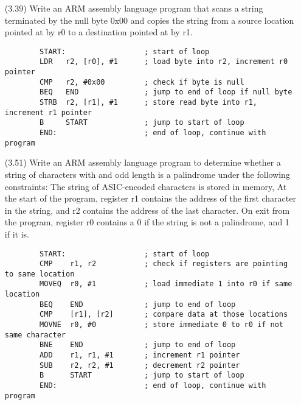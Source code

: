 \documentclass[letterpaper,10pt,titlepage]{article}
\begin{document}
\begin{enumerate}
	\item[(3.39)] Write an ARM assembly language program that scans a string
		terminated by the null byte 0x00 and copies the string from a source
		location pointed at by r0 to a destination pointed at by r1.
		\\
		\begin{verbatim}
		START:                  ; start of loop
		LDR   r2, [r0], #1      ; load byte into r2, increment r0 pointer
		CMP   r2, #0x00         ; check if byte is null
		BEQ   END               ; jump to end of loop if null byte
		STRB  r2, [r1], #1      ; store read byte into r1, increment r1 pointer
		B     START             ; jump to start of loop
		END:                    ; end of loop, continue with program
		\end{verbatim}

	\item[(3.51)] Write an ARM assembly language program to determine whether a string
		of characters with and odd length is a palindrome under the following
		constraints: The string of ASIC-encoded characters is stored in memory, At
		the start of the program, register r1 contains the address of the first
		character in the string, and r2 contains the address of the last
		character. On exit from the program, register r0 contains a 0 if the
		string is not a palindrome, and 1 if it is.
		\\
		\begin{verbatim}
		START:                  ; start of loop
		CMP    r1, r2           ; check if registers are pointing to same location
		MOVEQ  r0, #1           ; load immediate 1 into r0 if same location
		BEQ    END              ; jump to end of loop
		CMP    [r1], [r2]       ; compare data at those locations
		MOVNE  r0, #0           ; store immediate 0 to r0 if not same character
		BNE    END              ; jump to end of loop
		ADD    r1, r1, #1       ; increment r1 pointer
		SUB    r2, r2, #1       ; decrement r2 pointer
		B      START            ; jump to start of loop
		END:                    ; end of loop, continue with program
		\end{verbatim}

\end{enumerate}
\end{document}
